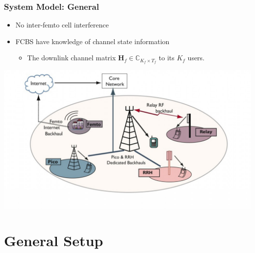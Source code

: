 \documentclass[10pt,tgadventor, onlymath]{beamer}
\begin{document}
\begin{frame}
\frametitle{System Model: General}
\begin{itemize}
\setlength\itemsep{2em}

\item 
	No inter-femto cell interference
\item 
	FCBS have knowledge of channel state information 
	\begin{itemize}
	\item 
	The downlink channel matrix $\mathbf{H}_f \in \mathbb{C}_{K_{f} \times T_{f}} $ to its $K_{f} $ users.

	\end{itemize}
\end{itemize}
	\bigskip
	\centering
		\includegraphics[scale=.2]{het_net}
\end{frame}


\section{General Setup}
\end{document}
